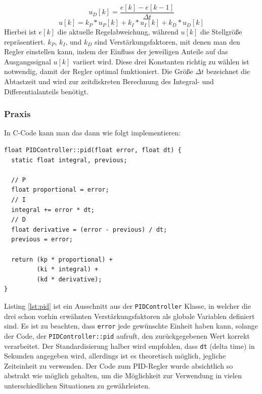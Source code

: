 \begin{equation}
    u_D[k] = \frac{e[k] - e[k-1]}{\Delta t}
\end{equation}
\begin{equation}
    u[k] = k_P * u_P[k] + k_I * u_I[k] + k_D * u_D[k]
\end{equation}
%
Hierbei ist $e[k]$ die aktuelle Regelabweichung,
während $u[k]$ die Stellgröße repräsentiert.
%
$k_P$, $k_I$, und $k_D$ sind Verstärkungsfaktoren,
mit denen man den Regler einstellen kann,
indem der Einfluss der jeweiligen Anteile
auf das Ausgangssignal $u[k]$ variiert wird.
%
Diese drei Konstanten richtig zu wählen ist notwendig,
damit der Regler optimal funktioniert.
%
Die Größe $\Delta t$ bezeichnet die Abtastzeit und wird zur zeitdiskreten
Berechnung des Integral- und Differentialanteils benötigt.

\subsubsection{Praxis}
In C-Code kann man das dann wie folgt implementieren:
\begin{lstlisting}[caption={Implementierung des PID-Reglers in C},label=lst:pid]
float PIDController::pid(float error, float dt) {
  static float integral, previous;

  // P
  float proportional = error;
  // I
  integral += error * dt;
  // D
  float derivative = (error - previous) / dt;
  previous = error;

  return (kp * proportional) +
         (ki * integral) +
         (kd * derivative);
}
\end{lstlisting}
Listing \ref{lst:pid} ist ein Ausschnitt aus der \texttt{PIDController} Klasse,
in welcher die drei schon vorhin erwähnten Verstärkungsfaktoren als globale Variablen definiert sind.
%  
Es ist zu beachten,
dass \texttt{error}
jede gewünschte Einheit haben kann,
solange der Code,
der \texttt{PIDController::pid} aufruft,
den zurückgegebenen Wert korrekt verarbeitet.
%
Der Standardisierung halber wird empfohlen,
dass \texttt{dt} (delta time) in Sekunden angegeben wird,
allerdings ist es theoretisch möglich,
jegliche Zeiteinheit zu verwenden. 
%
Der Code zum PID-Regler wurde absichtlich so abstrakt wie möglich gehalten,
um die Möglichkeit zur Verwendung in vielen unterschiedlichen Situationen zu gewährleisten.

